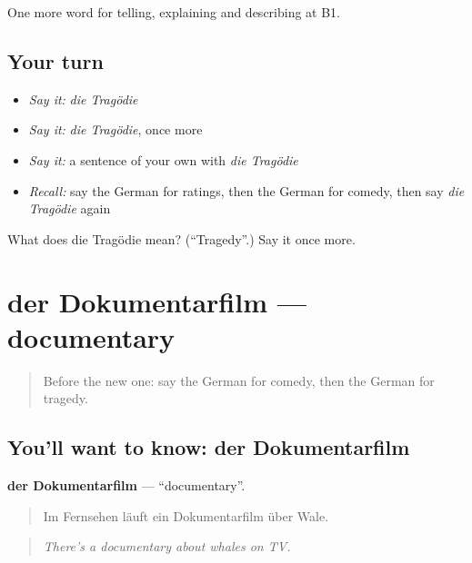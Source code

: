 \begin{grammarlens}[title={What you've built}]
One more word for telling, explaining and describing at B1.
\end{grammarlens}

\subsection*{Your turn}
\begin{itemize}
\raggedright
  \item \emph{Say it:} \emph{die Tragödie}
  \item \emph{Say it:} \emph{die Tragödie}, once more
  \item \emph{Say it:} a sentence of your own with \emph{die Tragödie}
  \item \emph{Recall:} say the German for ratings, then the German for comedy, then say \emph{die Tragödie} again
\end{itemize}

\begin{tcolorbox}[breakable,colback=teal!4,colframe=teal!35!black,title={Before you move on}]
What does die Tragödie mean? (\textquotedblleft{}Tragedy\textquotedblright{}.) Say it once more.
\end{tcolorbox}
\section[der Dokumentarfilm]{der Dokumentarfilm — documentary}

\label{lesson:GE-C524-dokumentarfilm}



\begin{quote}
Before the new one: say the German for comedy, then the German for tragedy.
\end{quote}

\subsection*{You'll want to know: der Dokumentarfilm}
\textbf{der Dokumentarfilm} — \textquotedblleft{}documentary\textquotedblright{}.

\begin{quote}
Im Fernsehen läuft ein Dokumentarfilm über Wale.
\end{quote}

\begin{quote}
\emph{There's a documentary about whales on TV.}
\end{quote}

